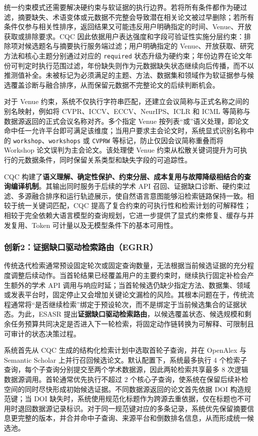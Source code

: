 \documentclass[a4paper,12pt,fontset=none]{ctexart}
\begin{document}
统一约束模式还需要解决硬约束与软证据的执行边界。若将所有条件都作为硬过滤，摘要缺失、术语变体或元数据不完整会导致潜在相关论文被过早删除；若所有条件仅参与相关性排序，返回结果又可能违反用户明确指定的时间、Venue、开放获取或排除要求。CQC 因此依据用户表达强度和字段可验证性实施分层约束：排除项对候选题名与摘要执行服务端过滤；用户明确指定的 Venue、开放获取、研究方法和核心主题分别通过对应的 \texttt{required} 状态升级为硬约束；年份边界在论文年份可判定时执行范围过滤，年份缺失则作为元数据缺失状态继续向后传播，而不以推测值补全。未被标记为必须满足的主题、方法、数据集和领域作为软证据参与候选覆盖诊断与融合排序，从而保留元数据不完整论文的后续判断机会。

对于 Venue 约束，系统不仅执行字符串匹配，还建立会议简称与正式名称之间的别名映射，例如将 CVPR、ICCV、ECCV、NeurIPS、ICLR 和 ICML 等简称与数据源返回的正式会议名称对齐。多个指定 Venue 按列表“或”语义处理，即论文命中任一允许平台即可满足该维度；当用户要求主会论文时，系统显式识别名称中的 \texttt{workshop}、\texttt{workshops} 或 \texttt{CVPRW} 等标记，防止仅因会议简称重叠而将 Workshop 论文误判为主会论文。该处理使 Venue 约束从松散关键词提升为可执行的元数据条件，同时保留关系类型和缺失字段的可追踪性。

CQC  构建了\textbf{语义理解、确定性保护、约束分层、成本复用与故障降级相结合的查询编译机制}。其输出同时服务于后续的学术 API 召回、证据缺口诊断、硬约束过滤、多源融合排序和运行轨迹展示，使自然语言意图能够沿检索链路保持一致。相较于统一关键词匹配，CQC 提高了复合约束的可执行性和检索计划的可解释性；相较于完全依赖大语言模型的查询规划，它进一步提供了显式约束修复、缓存与并发复用、Token 可计量以及无模型条件下的基本可用性。

\subsubsection{创新2：证据缺口驱动检索路由（EGRR）}

传统迭代检索通常预设固定轮次或固定查询数量，无法根据当前候选证据的充分程度调整后续动作。当首轮结果已经覆盖用户的主要约束时，继续执行固定补检会产生额外的学术 API 调用与响应时延；当首轮候选仍缺少指定方法、数据集、领域或发表平台时，固定停止又会增加关键论文漏检的风险。其根本问题在于，传统流程通常将“是否继续检索”绑定于预设轮次，而不是绑定于当前候选集合的证据状态。为此，ESASR 提出\textbf{证据缺口驱动检索路由}，以候选覆盖状态、候选规模和剩余任务预算共同决定是否进入下一轮检索，将固定动作链转换为可解释、可限制且可审计的状态决策过程。

系统首先从 CQC 生成的结构化检索计划中选取首轮子查询，并在 OpenAlex 与 Semantic Scholar 上并行召回候选论文。默认配置下，系统最多执行 4 个检索子查询，每个子查询分别提交至两个学术数据源，因此两轮检索共享最多 8 次逻辑数据源调用。首轮通常优先执行不超过 2 个核心子查询，使系统在保留后续补检空间的同时尽快形成初始候选证据。不同数据源返回的论文首先依据 DOI 构造规范键；当 DOI 缺失时，系统使用规范化标题作为跨源去重依据，仅在标题也不可用时退回数据源记录标识。对于同一规范键对应的多条记录，系统优先保留摘要信息更完整的版本，并合并命中子查询、来源平台和倒数排名信息，从而形成统一候选池。
\end{document}
